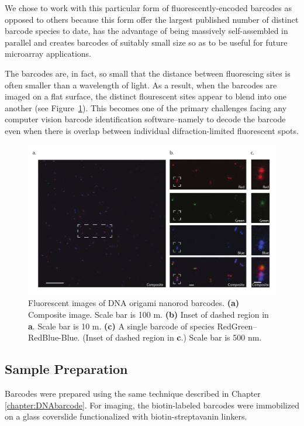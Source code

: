 We chose to work with this particular form of fluorescently-encoded barcodes as opposed to others because this form offer the largest published number of distinct barcode species to date, has the advantage of being massively self-assembled in parallel and creates barcodes of suitably small  size so as to be useful for future microarray applications. 

The barcodes are, in fact, so small that the distance between fluorescing sites is often smaller than a wavelength of light. As a result, when the barcodes are imaged on a flat surface, the distinct flourescent sites appear to blend into one another (see Figure~\ref{fig:rawImage}). This becomes one of the primary challenges facing any computer vision barcode identification software--namely to  decode the barcode even when there is overlap between individual difraction-limited fluorescent spots. 
\begin{figure}[htbp]
\begin{center}
	\includegraphics[width=\textwidth]{figures/theoryRawImage}
	\caption{Fluorescent images of DNA origami nanorod barcodes. \textbf{(a)} Composite image. Scale bar is 100 \textmu m. \textbf{(b)} Inset of dashed region in \textbf{a}. Scale bar is 10 \textmu m. \textbf{(c)} A single barcode of species RedGreen--RedBlue-Blue. (Inset of dashed region in \textbf{c}.) Scale bar is 500 nm. \label{fig:rawImage}}
\end{center}	
\end{figure}



\subsection{Sample Preparation}
Barcodes were prepared using the same technique described in Chapter \ref{chapter:DNAbarcode}. For imaging, the biotin-labeled barcodes were immobilized on a glass coverslide functionalized with biotin-streptavanin linkers.  

